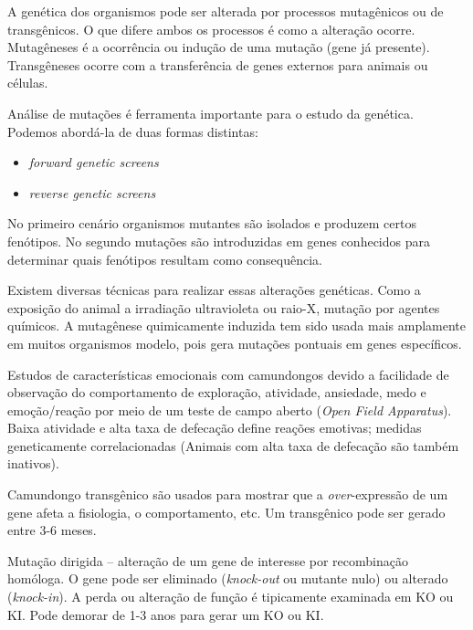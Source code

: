 \documentclass[
	article,			%
	12pt,				%
	oneside,			%
	a4paper,			%
	english,			%
	brazil,				%
	sumario=tradicional
	]{abntex2}
\begin{document}
A genética dos organismos pode ser alterada por processos mutagênicos ou de transgênicos. O que difere ambos os processos é como a alteração ocorre. Mutagêneses é a ocorrência ou indução de uma mutação (gene já presente). Transgêneses ocorre com a transferência de genes externos para animais ou células.

Análise de mutações é ferramenta importante para o estudo da genética. Podemos abordá-la de duas formas distintas:
\begin{itemize}
    \item \textit{forward genetic screens}
    \item \textit{reverse genetic screens}
\end{itemize}
No primeiro cenário organismos mutantes são isolados e produzem certos fenótipos.
No segundo mutações são introduzidas em genes conhecidos para determinar quais fenótipos resultam como consequência.

Existem diversas técnicas para realizar essas alterações genéticas. Como a exposição do animal a irradiação ultravioleta ou raio-X, mutação por agentes químicos.
A mutagênese quimicamente induzida tem sido usada mais amplamente em muitos organismos modelo, pois gera mutações pontuais em genes específicos.

Estudos de características emocionais com camundongos devido a facilidade de observação do comportamento de exploração,	atividade,	ansiedade,	medo	e emoção/reação	por meio de	um teste de	campo	aberto	(\textit{Open	Field	
Apparatus}). Baixa	atividade	e	alta taxa	de	defecação	define	 reações	emotivas;	 medidas	geneticamente correlacionadas	(Animais	com	alta taxa	de	defecação	são	também	inativos).	

Camundongo	transgênico	são usados	para	mostrar	que	a	\textit{over}-expressão	de	um	gene	afeta	a	fisiologia,	o	
comportamento,	etc. Um	transgênico	pode ser	 gerado	entre	3-6	meses.

Mutação	dirigida	–	alteração	de	um	gene	de	interesse	por recombinação	homóloga. O	gene	pode	ser	eliminado (\textit{knock-out}	ou	mutante	nulo)	ou	alterado (\textit{knock-in}).		A	perda	ou	alteração	de	função	é	tipicamente	examinada	em	KO	ou KI. Pode	demorar	de	1-3	anos para	gerar	um	KO	ou	KI.
\end{document}
